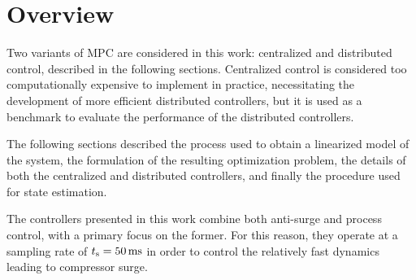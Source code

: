 \section{Overview}

Two variants of MPC are considered in this work: centralized and distributed control, described in the following sections.
Centralized control is considered too computationally expensive to implement in practice, necessitating the development of more efficient distributed controllers, but it is used as a benchmark to evaluate the performance of the distributed controllers.


The following sections described the process used to obtain a linearized model of the system, the formulation of the resulting optimization problem, the details of both the centralized and distributed controllers, and finally the procedure used for state estimation.

The controllers presented in this work combine both anti-surge and process control, with a primary focus on the former. 
For this reason, they operate at a sampling rate of $t_\text{s} = \SI{50}{ms}$ in order to control the relatively fast dynamics leading to compressor surge.

